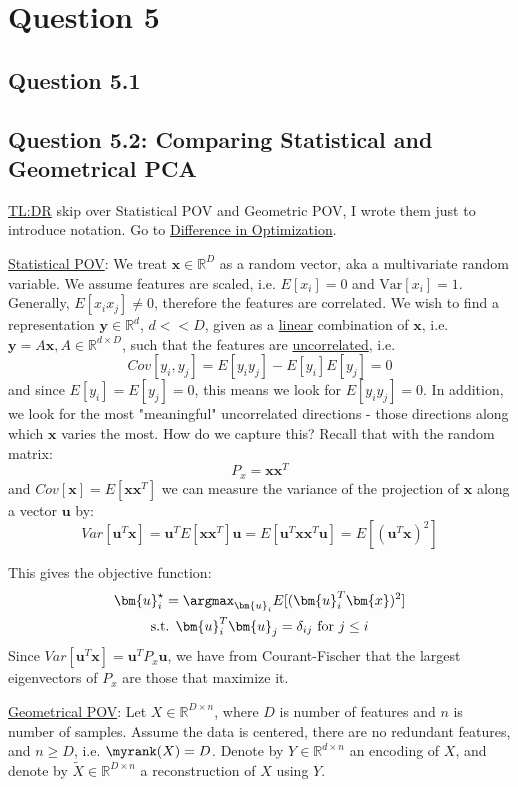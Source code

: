 \documentclass{article}
\begin{document}
\section*{Question 5}
\subsection*{Question 5.1}

\subsection*{Question 5.2: Comparing Statistical and Geometrical PCA}
\ul{TL:DR} skip over Statistical POV and Geometric POV, I wrote them just to introduce notation. Go to \ul{Difference in Optimization}. 


\ul{Statistical POV}: We treat $\bm{x} \in \mathbb{R}^{D}$ as a random vector, aka a multivariate random variable. We assume features are scaled, i.e. $E[x_i]=0$ and $\text{Var}[x_i]=1$.  Generally, $E[x_i x_j] \neq 0$, therefore the features are correlated. We wish to find a representation $\bm{y} \in \mathbb{R}^{d}$, $d <<D$, given as a \ul{linear} combination of $\bm{x}$, i.e. $\bm{y}=A \bm{x}, A \in \mathbb{R}^{d \times D}$, such that the features are \ul{uncorrelated}, i.e.
\[
  Cov[y_i,y_j]= E[y_i y_j] - E[y_i] E[y_j] =  0
\]
and since $E[y_i]=E[y_j]=0$, this means we look for $E[y_i y_j]=0$. In addition, we look for the most "meaningful" uncorrelated directions - those directions along which $\bm{x}$ varies the most. How do we capture this? Recall that with the random matrix:
\[
  P_{x} = \bm{x} \bm{x}^{T}
\]
and $Cov[\bm{x}] = E[\bm{x} \bm{x}^{T}]$
we can measure the variance of the projection of $\bm{x}$ along a vector $\bm{u}$ by:
\[
  Var[\bm{u} ^{T} \bm{x}] = \bm{u}^{T} E[\bm{x} \bm{x}^{T}] \bm{u} = E[\bm{u}^{T} \bm{x} \bm{x} ^{T} \bm{u}] = E[(\bm{u}^{T} \bm{x}) ^2]
\]

This gives the objective function:
\begin{gather*}
  \bm{u}_{i} ^{\star} = \argmax_{\bm{u}_i} E[(\bm{u}_i ^{T} \bm{x})^2]   \\
  \text{s.t. } \bm{u}_i ^{T} \bm{u}_{j} = \delta_{ij} \text{ for } j \leq i
\end{gather*}
Since $Var[\bm{u}^{T} \bm{x}] = \bm{u}^{T} P_{x} \bm{u}$, we have from Courant-Fischer that the largest eigenvectors of $P_{x}$ are those that maximize it. 


\ul{Geometrical POV}: Let $X \in \mathbb{R}^{D \times  n}$, where $D$ is number of features and $n$ is number of samples. Assume the data is centered, there are no redundant features, and $n \geq D$, i.e. $\myrank(X) = D$.  Denote by $Y \in \mathbb{R}^{d \times  n}$ an encoding of $X$, and denote by   $\widetilde{X} \in \mathbb{R}^{D \times  n}$ a reconstruction of $X$ using $Y$.
\end{document}
